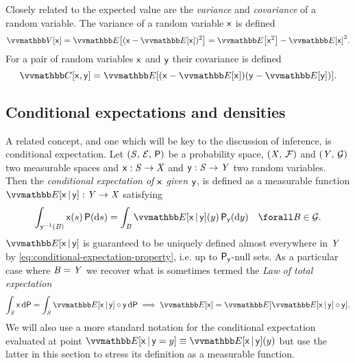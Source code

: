 Closely related to the expected value are the \emph{variance} and \emph{covariance} of a random variable. The variance of a random variable $\mathsf{x}$ is defined
\begin{equation}\label{eq:variance-definition}
  \var{\rvar{x}} = \expc{(\rvar{x} - \expc{\rvar{x}})^2} = \expc{\rvar{x}^2} - \expc{\rvar{x}}^2.
\end{equation}
For a pair of random variables $\mathsf{x}$ and $\mathsf{y}$ their covariance is defined 
\begin{equation}\label{eq:covvariance-definition}
  \cov{\rvar{x}, \rvar{y}} = \expc{(\rvar{x} - \expc{\rvar{x}})(\rvar{y} - \expc{\rvar{y}})}.
\end{equation}

\subsection{Conditional expectations and densities}

A related concept, and one which will be key to the discussion of inference, is conditional expectation. Let $(\mathit{S},\,\mathcal{E},\,\mathsf{P})$ be a probability space, $(\mathit{X},\,\mathcal{F})$ and $(\mathit{Y},\,\mathcal{G})$ two measurable spaces and $\mathsf{x} : \mathit{S} \to \mathit{X}$ and $\mathsf{y} : \mathit{S} \to \mathit{Y}$ two random variables. Then the \emph{conditional expectation of $\mathsf{x}$ given $\mathsf{y}$}, is defined as a measurable function $\expc{\rvar{x}\gvn\rvar{y}} : \set{Y} \to \set{X}$ satisfying
\begin{equation}\label{eq:conditional-expectation-property}
  \int_{\rvar{y}^{-1}(\set{B})} \rvar{x}(s) \,\probability(\dr s) =
  \int_{\set{B}} \expc{\rvar{x}\gvn\rvar{y}}(y) \,\prob{\rvar{y}}(\dr y)
  \quad \forall \set{B} \in \sset{G}.
\end{equation}
$\expc{\rvar{x}\gvn\rvar{y}}$ is guaranteed to be uniquely defined almost everywhere in $\mathit{Y}$ by \eqref{eq:conditional-expectation-property}, i.e. up to $\mathsf{P}_{\mathsf{y}}$-null sets. As a particular case where $\mathit{B} = \mathit{Y}$ we recover what is sometimes termed the \emph{Law of total expectation}
\begin{equation}\label{eq:law-of-total-expectation}
  \int_{\set{S}} \rvar{x} \,\dr\probability =
  \int_{\set{S}} \expc{\rvar{x}\gvn\rvar{y}} \circ \rvar{y} \,\dr\probability
   \implies
  \expc{\rvar{x}} =
  \expc{\expc{\rvar{x}\gvn\rvar{y}}\circ\rvar{y}}.
\end{equation}
We will also use a more standard notation for the conditional expectation evaluated at point $\expc{\rvar{x}\gvn\rvar{y} = y} \equiv \expc{\rvar{x}\gvn\rvar{y}}(y)$ but use the latter in this section to stress its definition as a measurable function.

